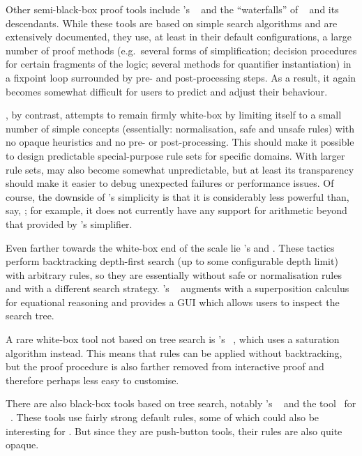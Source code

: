 Other semi-black-box proof tools include \PVS's \grind{}~\cite{PVS-tutorial} and
the \enquote{waterfalls} of \ACLtwo~\cite{ACL2} and its descendants. While these
tools are based on simple search algorithms and are extensively documented, they
use, at least in their default configurations, a large number of proof methods
(e.g.\ several forms of simplification; decision procedures for certain
fragments of the logic; several methods for quantifier instantiation) in a
fixpoint loop surrounded by pre- and post-processing steps. As a result, it again
becomes somewhat difficult for users to predict and adjust their behaviour.

\Aesop, by contrast, attempts to remain firmly white-box by limiting itself to a
small number of simple concepts (essentially: normalisation, safe and unsafe
rules) with no opaque heuristics and no pre- or post-processing. This should make
it possible to design predictable special-purpose rule sets for specific
domains. With larger rule sets, \Aesop{} may also become somewhat unpredictable,
but at least its transparency should make it easier to debug unexpected failures
or performance issues. Of course, the downside of \Aesop's simplicity is that it
is considerably less powerful than, say, \grind; for example, it does not
currently have any support for arithmetic beyond that provided by \Lean's
simplifier.

Even farther towards the white-box end of the scale lie \Coq's \auto{} and
\eauto. These tactics perform backtracking depth-first search (up to some
configurable depth limit) with arbitrary rules, so they are essentially \Aesop{}
without safe or normalisation rules and with a different search strategy.
\Matita's \auto~\cite{Matita} augments \eauto{} with a superposition calculus
for equational reasoning and provides a GUI which allows users to inspect the
search tree.

A rare white-box tool not based on tree search is \Isabelle's
\autotwo~\cite{auto2}, which uses a saturation algorithm instead. This means
that rules can be applied without backtracking, but the proof procedure is also
farther removed from interactive proof and therefore perhaps less easy to
customise.

There are also black-box tools based on tree search, notably \Coq's
\sauto~\cite{sauto} and the \Agsy{} tool~\cite{Agsy} for \Agda~\cite{Agda}.
These tools use fairly strong default rules, some of which could also be
interesting for \Aesop. But since they are push-button tools, their rules are
also quite opaque.

